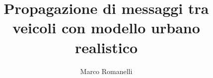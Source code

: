 
\title{Propagazione di messaggi tra veicoli con modello urbano realistico}
\author{Marco Romanelli}




